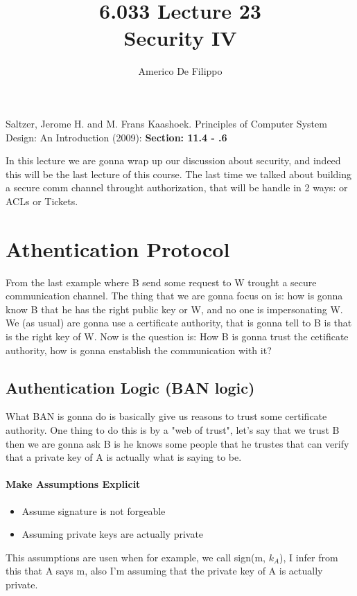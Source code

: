 \documentclass{article}
\title{6.033 Lecture 23 \\ Security IV}
\author{Americo De Filippo}
\begin{document}
 
  \maketitle
    \begin{thebibliography}{9}
      Saltzer, Jerome H. and M. Frans Kaashoek. Principles of Computer System Design: An Introduction (2009): \textbf{Section: 11.4 - .6} 
    \end{thebibliography}
    \maketitle
    In this lecture we are gonna wrap up our discussion about security, and indeed this will be 
    the last lecture of this course. The last time we talked about building a secure comm channel
    throught authorization, that will be handle in 2 ways: or ACLs or Tickets.
    \section{Athentication Protocol}
      From the last example where B send some request to W trought a secure communication channel.
      The thing that we are gonna focus on is: how is gonna know B that he has the right public key
      or W, and no one is impersonating W. We (as usual) are gonna use a certificate authority, 
      that is gonna tell to B is that is the right key of W. Now is the question is: How B is gonna
      trust the cetificate authority, how is gonna enstablish the communication with it?
      \subsection{Authentication Logic (BAN logic)}
        What BAN is gonna do is basically give us reasons to trust some certificate authority.
        One thing to do this is by a "web of trust", let's say that we trust B then we are gonna
        ask B is he knows some people that he trustes that can verify that a private key of A is 
        actually what is saying to be.
        \paragraph{Make Assumptions Explicit}  
          \begin{itemize}
            \item Assume signature is not forgeable
            \item Assuming private keys are actually private
          \end{itemize}
          This assumptions are usen when for example, we call sign(m, $k_A$), I infer from 
          this that A says m, also I'm assuming that the private key of A is actually private.
\end{document}
